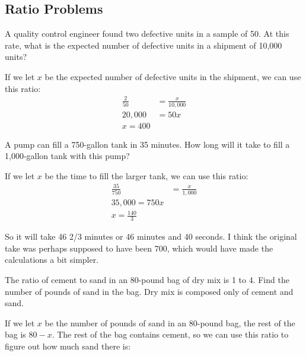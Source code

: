 \documentclass[fleqn,addpoints]{exam}
\begin{document}
\subsection{Ratio Problems}
\begin{questions}

\question
A quality control engineer found two defective units in a sample of 50.  At this rate, what is the expected number of
defective units in a shipment of 10,000 units?

\begin{solution}

If we let $x$ be the expected number of defective units in the shipment, we can use this ratio:
\begin{align*}
  \frac{2}{50} &= \frac{x}{10,000} \\
  20,000 &= 50x \\
  x = 400
\end{align*}

\end{solution}

\question
A pump can fill a 750-gallon tank in 35 minutes.  How long will it take to fill a 1,000-gallon tank with this pump?

\begin{solution}

If we let $x$ be the time to fill the larger tank, we can use this ratio:
\begin{align*}
  \frac{35}{750} &= \frac{x}{1,000} \\
  35,000 = 750x \\
  x = \frac{140}{3}
\end{align*}

So it will take 46 2/3 minutes or 46 minutes and 40 seconds.  I think the original take was perhaps supposed to have
been 700, which would have made the calculations a bit simpler.

\end{solution}

\question
The ratio of cement to sand in an 80-pound bag of dry mix is 1 to 4.  Find the number of pounds of sand in the bag.
Dry mix is composed only of cement and sand.

\begin{solution}

If we let $x$ be the number of pounds of sand in an 80-pound bag, the rest of the bag is $80-x$.  The rest of the bag
contains cement, so we can use this ratio to figure out how much sand there is:


\end{solution}
\end{questions}
\end{document}

